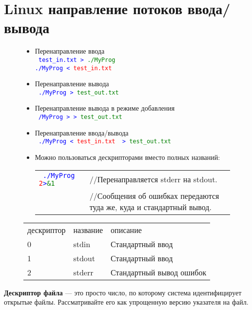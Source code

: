 \documentclass {article}
\begin{document}
\section{Linux направление потоков ввода/вывода}
\begin{figure}[h]
\begin{minipage}[tH]{0.55\linewidth}
\begin{itemize}
\item Перенаправление ввода\\
\texttt{
\textcolor{blue}{test\_in.txt >}\textcolor{green}{ ./MyProg}\\
\textcolor{blue}{./MyProg <} \textcolor{red}{test\_in.txt}
}
\item Перенаправление вывода\\
\texttt{
\textcolor{blue}{./MyProg >} \textcolor{green}{test\_out.txt}
}
\item Перенаправление вывода в режиме добавления\\
\texttt{
\textcolor{blue}{/MyProg > > }\textcolor{green}{test\_out.txt}
}
\item Перенаправление ввода/вывода\\
\texttt{
\textcolor{blue}{./MyProg <}\textcolor{red}{ test\_in.txt} \textcolor{blue}{ >}\textcolor{green}{ test\_out.txt}
}
\item Можно пользоваться дескрипторами вместо полных названий:\\
\begin{tabular}{l l}
\texttt{
\textcolor{blue}{./MyProg} \textcolor{red}{2}\textcolor{blue}{>}\textcolor{green}{\&1} }& //Перенаправляется stderr на stdout.\\
& //Сообщения об ошибках передаются туда же, куда и стандартный вывод. \\
\end{tabular}
\end{itemize}
\end{minipage}
\begin{tabular}[tH]{l l l}
\rowcolor[rgb]{0.8,0.2,0.2}	 дескриптор & название & описание \\\tabrowsep
\rowcolor[rgb]{0.7,0.7,0.7}	 0 & stdin &Стандартный ввод\\\tabrowsep
\rowcolor[rgb]{0.7,0.7,0.7} 1 & stdout &Стандартный ввод\\\tabrowsep
\rowcolor[rgb]{0.7,0.7,0.7}	 2 & stderr &Стандартный вывод ошибок\\
\end{tabular}
\end{figure}
{\bfseries Дескриптор файла} --- это просто число, по которому система идентифицирует открытые файлы. Рассматривайте его как упрощенную версию указателя на файл.\\
\end{document}
